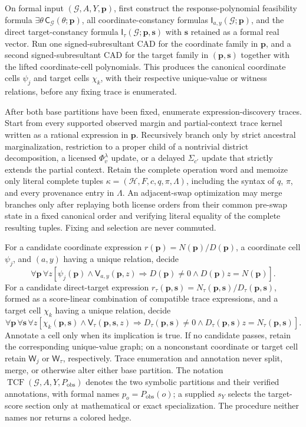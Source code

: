 On formal input \((\mathcal G,A,Y,\mathbf p)\), first construct the response-polynomial feasibility formula \(\exists\theta\,\mathsf C_{\mathcal G}(\theta;\mathbf p)\), all coordinate-constancy formulas \(\mathsf I_{a,y}(\mathcal G;\mathbf p)\), and the direct target-constancy formula \(\mathsf I_{\tau}(\mathcal G;\mathbf p,\mathbf s)\) with \(\mathbf s\) retained as a formal real vector. Run one signed-subresultant CAD for the coordinate family in \(\mathbf p\), and a second signed-subresultant CAD for the target family in \((\mathbf p,\mathbf s)\) together with the lifted coordinate-cell polynomials. This produces the canonical coordinate cells \(\psi_j\) and target cells \(\chi_k\), with their respective unique-value or witness relations, before any fixing trace is enumerated.

After both base partitions have been fixed, enumerate expression-discovery traces. Start from every supported observed margin and partial-context trace kernel written as a rational expression in \(\mathbf p\). Recursively branch only by strict ancestral marginalization, restriction to a proper child of a nontrivial district decomposition, a licensed \(\Phi_v^{\lambda}\) update, or a delayed \(\Sigma_{c'}\) update that strictly extends the partial context. Retain the complete operation word and memoize only literal complete tuples \(\kappa=(\mathcal H,F,c,q,\pi,\Lambda)\), including the syntax of \(q\), \(\pi\), and every provenance entry in \(\Lambda\). An adjacent-swap optimization may merge branches only after replaying both license orders from their common pre-swap state in a fixed canonical order and verifying literal equality of the complete resulting tuples. Fixing and selection are never commuted.

For a candidate coordinate expression \(r(\mathbf p)=N(\mathbf p)/D(\mathbf p)\), a coordinate cell \(\psi_j\), and \((a,y)\) having a unique relation, decide
\[
\forall\mathbf p\,\forall z
\left[
\psi_j(\mathbf p)\wedge\mathsf V_{a,y}(\mathbf p,z)
\Longrightarrow
D(\mathbf p)\neq0\wedge D(\mathbf p)z=N(\mathbf p)
\right].
\]
For a candidate direct-target expression \(r_{\tau}(\mathbf p,\mathbf s)=N_{\tau}(\mathbf p,\mathbf s)/D_{\tau}(\mathbf p,\mathbf s)\), formed as a score-linear combination of compatible trace expressions, and a target cell \(\chi_k\) having a unique relation, decide
\[
\forall\mathbf p\,\forall\mathbf s\,\forall z
\left[
\chi_k(\mathbf p,\mathbf s)\wedge\mathsf V_{\tau}(\mathbf p,\mathbf s,z)
\Longrightarrow
D_{\tau}(\mathbf p,\mathbf s)\neq0
\wedge D_{\tau}(\mathbf p,\mathbf s)z=N_{\tau}(\mathbf p,\mathbf s)
\right].
\]
Annotate a cell only when its implication is true. If no candidate passes, retain the corresponding unique-value graph; on a nonconstant coordinate or target cell retain \(\mathsf W_j\) or \(\mathsf W_{\tau}\), respectively. Trace enumeration and annotation never split, merge, or otherwise alter either base partition. The notation \(\operatorname{TCF}(\mathcal G,A,Y,P_{\mathrm{obs}})\) denotes the two symbolic partitions and their verified annotations, with formal names \(p_o=P_{\mathrm{obs}}(o)\); a supplied \(s_Y\) selects the target-score section only at mathematical or exact specialization. The procedure neither names nor returns a colored hedge.